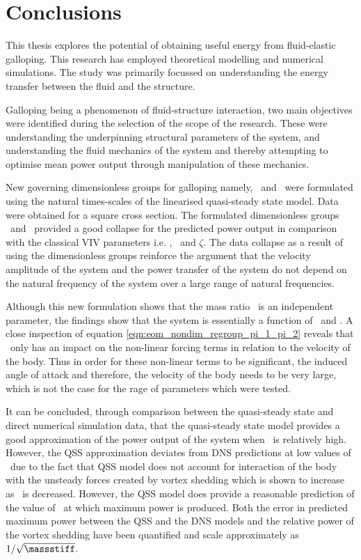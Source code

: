 \chapter{Conclusions}

This thesis explores the potential of obtaining useful energy from fluid-elastic galloping. This research has employed theoretical modelling and numerical simulations. The study was primarily focussed on understanding the energy transfer between the fluid and the structure.  

Galloping being a phenomenon of fluid-structure interaction, two main objectives were identified during the selection of the scope of the research. These were understanding the underpinning structural parameters of the system, and understanding the fluid mechanics of the system and thereby attempting to optimise mean power output through manipulation of these mechanics.

New governing dimensionless groups for galloping namely, \massstiff\ and \massdamp\ were formulated using the natural times-scales of the linearised quasi-steady state model. Data were obtained for a square cross section. The formulated dimensionless groups \massstiff\ and \massdamp\ provided a good collapse for the predicted power output in comparison with the classical VIV parameters i.e. \ustar, \mstar\ and $\zeta$. The data collapse as a result of using the dimensionless groups reinforce the argument that the velocity amplitude of the system and the power transfer of the system do not depend on the natural frequency of the system over a large range of natural frequencies.

Although this new formulation shows that the mass ratio \mstar\ is an independent parameter, the findings show that the system is essentially a function of \massstiff\ and \massdamp. A close inspection of equation \ref{eqn:eom_nondim_regroup_pi_1_pi_2} reveals that \mstar\ only has an impact on the non-linear forcing terms in relation to the velocity of the body. Thus in order for these non-linear terms to be significant, the induced angle of attack and therefore, the velocity of the body needs to be very large, which is not the case for the rage of parameters which were tested. 

 It can be concluded, through comparison between the quasi-steady state and direct numerical simulation data, that the quasi-steady state model provides a good approximation of the power output of the system when \massstiff\ is relatively high. However, the QSS approximation deviates from  DNS predictions at low values of \massstiff\ due to the fact that QSS model does not account for interaction of the body with the unsteady forces created by vortex shedding which is shown to increase as \massstiff\ is decreased. However, the QSS model does provide a reasonable prediction of the value of \massdamp\ at which maximum power is produced. Both the error in predicted maximum power between the QSS and the DNS models and the relative power of the vortex shedding have been quantified and scale approximately as $1/\sqrt{\massstiff}$.
 
